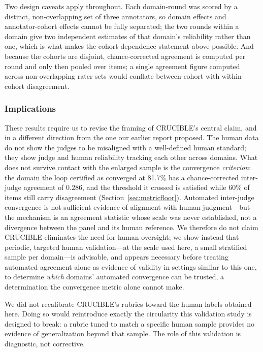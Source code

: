 \documentclass[11pt]{article}
\begin{document}
Two design caveats apply throughout. Each domain-round was scored by a
distinct, non-overlapping set of three annotators, so domain effects and
annotator-cohort effects cannot be fully separated; the two rounds within
a domain give two independent estimates of that domain's reliability
rather than one, which is what makes the cohort-dependence statement above
possible. And because the cohorts are disjoint, chance-corrected agreement
is computed per round and only then pooled over items; a single agreement
figure computed across non-overlapping rater sets would conflate
between-cohort with within-cohort disagreement.

\subsubsection{Implications}

These results require us to revise the framing of CRUCIBLE's central claim,
and in a different direction from the one our earlier report proposed. The
human data do not show the judges to be misaligned with a well-defined
human standard; they show judge and human reliability tracking each other
across domains. What does not survive contact with the enlarged sample is
the convergence \emph{criterion}: the domain the loop certified as
converged at 81.7\% has a chance-corrected inter-judge agreement of
$0.286$, and the threshold it crossed is satisfied while 60\% of items
still carry disagreement (Section~\ref{sec:metricfloor}). Automated
inter-judge convergence is not sufficient evidence of alignment with human
judgment---but the mechanism is an agreement statistic whose scale was
never established, not a divergence between the panel and its human
reference. We therefore do not claim
CRUCIBLE eliminates the need for human oversight; we show instead that
periodic, targeted human validation---at the scale used here, a small
stratified sample per domain---is advisable, and appears necessary before
treating automated agreement alone as evidence of validity in settings
similar to this one, to determine \emph{which} domains' automated
convergence can be trusted, a determination the convergence metric alone
cannot make.

We did not recalibrate CRUCIBLE's rubrics toward the human labels obtained
here. Doing so would reintroduce exactly the circularity this validation
study is designed to break: a rubric tuned to match a specific human sample
provides no evidence of generalization beyond that sample. The role of
this validation is diagnostic, not corrective.
\end{document}

